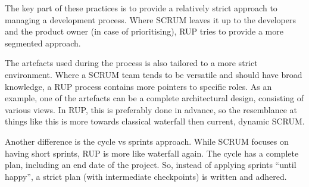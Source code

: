 \documentclass[]{uva-bachelor-thesis}
\def \CurrChapter {}
\def \CurrSection {}
\renewcommand{\chaptermark}[1]{\def \CurrChapter {#1} \def \CurrSection {}}
\begin{document}
The key part of these practices is to provide a relatively strict approach to managing a development process.
Where SCRUM leaves it up to the developers and the product owner (in case of prioritising), RUP tries to provide a more segmented approach. 

The artefacts used during the process is also tailored to a more strict environment. 
Where a SCRUM team tends to be versatile and should have broad knowledge, a RUP process contains more pointers to specific roles. 
As an example, one of the artefacts can be a complete architectural design, consisting of various views.
In RUP, this is preferably done in advance, so the resemblance at things like this is more towards classical waterfall then current, dynamic SCRUM.

Another difference is the cycle vs sprints approach. 
While SCRUM focuses on having short sprints, RUP is more like waterfall again. 
The cycle has a complete plan, including an end date of the project. 
So, instead of applying sprints ``until happy'', a strict plan (with intermediate checkpoints) is written and adhered. 



\chaptermark{Bibliography}
\end{document}
